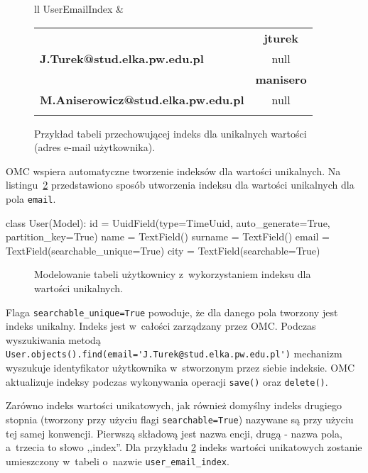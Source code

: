 \begin{figure}[ht!]
	\centering

	\begin{tabular}{ll}
		UserEmailIndex &
		\begin{tabular}{|l||c|}
			\hhline{|-||-|}
		 	& \textbf{jturek} \\
			\hhline{|~||=|}
			\textbf{J.Turek@stud.elka.pw.edu.pl} & null \\
			\hhline{|=::=}
			 & \textbf{manisero} \\
			\hhline{|~||=|}
			\textbf{M.Aniserowicz@stud.elka.pw.edu.pl} & null \\
			\hhline{|-||-|}
		\end{tabular} 
	\end{tabular}

	\caption{Przykład tabeli przechowującej indeks dla unikalnych wartości (adres e-mail użytkownika).}
	\label{tab:custom_unique_value_index_table}
\end{figure}

OMC wspiera automatyczne tworzenie indeksów dla wartości unikalnych. Na listingu~\ref{lst:omc_unique_index_modeling} przedstawiono sposób utworzenia indeksu dla wartości unikalnych dla pola \verb+email+.

\begin{verbbox}
class User(Model):
    id = UuidField(type=TimeUuid, auto_generate=True, partition_key=True)
    name = TextField()
    surname = TextField()
    email = TextField(searchable_unique=True)
    city = TextField(searchable=True)
\end{verbbox}

\begin{figure}[ht!]
	\centering
	\theverbbox
	\caption{Modelowanie tabeli użytkownicy z~wykorzystaniem indeksu dla wartości unikalnych.}
	\label{lst:omc_unique_index_modeling}
\end{figure}

Flaga \verb+searchable_unique=True+ powoduje, że dla danego pola tworzony jest indeks unikalny. Indeks jest w~całości zarządzany przez OMC. Podczas wyszukiwania metodą \verb+User.objects().find(email='J.Turek@stud.elka.pw.edu.pl')+ mechanizm wyszukuje identyfikator użytkownika w~stworzonym przez siebie indeksie. OMC aktualizuje indeksy podczas wykonywania operacji \verb+save()+ oraz \verb+delete()+.

Zarówno indeks wartości unikatowych, jak również domyślny indeks drugiego stopnia (tworzony przy użyciu flagi \verb+searchable=True+) nazywane są przy użyciu tej samej konwencji. Pierwszą składową jest nazwa encji, drugą - nazwa pola, a~trzecia to słowo ,,index''. Dla przykładu \ref{lst:omc_unique_index_modeling} indeks wartości unikatowych zostanie umieszczony w~tabeli o~nazwie \verb+user_email_index+.

